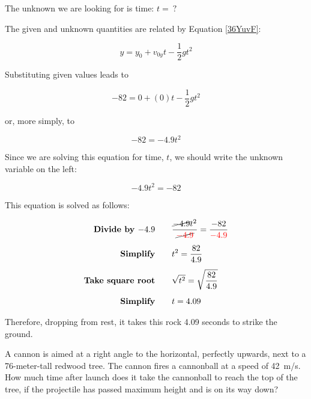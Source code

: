 \documentclass[main.tex]{subfiles}
\begin{document}
\vspace{1em}

The unknown we are looking for is time: $t =\ ?$

\vspace{1em}

The given and unknown quantities are related by Equation \eqref{36YuvF}:

\begin{equation*}
    y = y_0 + v_{0y}t - \frac{1}{2}  g t^2
\end{equation*}

Substituting given values leads to 

\begin{equation*}
    -82 = 0 + (0) t - \frac{1}{2} g t^2
\end{equation*}

or, more simply, to

\begin{equation*}
    -82 = - 4.9 t^2
\end{equation*}

Since we are solving this equation for time, $t$, we should write the unknown variable on the left:

\begin{equation*}
    -4.9 t^2 = -82
\end{equation*}

This equation is solved as follows:

\begin{align*}
    \textbf{Divide by $-4.9$} \qquad & \frac{\cancel{-4.9} t^2}{\cancel{\mathbin{\color{red} -} \textcolor{red}{4.9}}} = \frac{-82}{\mathbin{\color{red} -} \textcolor{red}{4.9}}\\[1ex]
    \textbf{Simplify} \qquad & t^2 = \frac{82}{4.9}\\[1ex]
    \textbf{Take square root} \qquad & \sqrt{t^2} = \sqrt{\frac{82}{4.9}}\\[1ex]
    \textbf{Simplify} \qquad & t = 4.09
\end{align*}

Therefore, dropping from rest, it takes this rock 4.09 seconds to strike the ground.

\solutionEnd


\begin{example} \label{lB7EDG}
    A cannon is aimed at a right angle to the horizontal, perfectly upwards, next to a 76-meter-tall redwood tree. The cannon fires a cannonball at a speed of \SI{42}{m/s}. How much time after launch does it take the cannonball to reach the top of the tree, if the projectile has passed maximum height and is on its way down?
\end{example}
\end{document}
